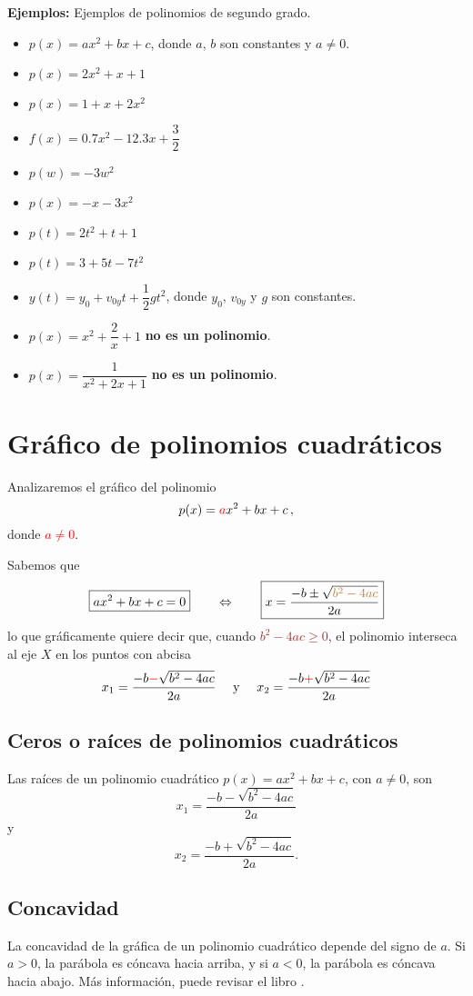 \documentclass{article}
\begin{document}
\medskip

\noindent
\textbf{Ejemplos:}
Ejemplos de polinomios de segundo grado.
\begin{itemize}
\item $p(x)=ax^2+bx+c$, donde $a$, $b$ son constantes y $a\neq 0$.
\item $p(x)=2x^2+x+1$
\item $p(x)=1+x+2x^2$
\item $f(x)=0.7x^2-12.3x+\dfrac{3}{2}$
\item $p(w)=-3w^2$
\item $p(x)=-x-3x^2$
\item $p(t)=2t^2+t+1$
\item $p(t)=3+5t-7t^2$
\item $y(t)=y_0+v_{0y}t+\dfrac{1}{2}gt^2$, donde $y_0$, $v_{0y}$ y $g$
  son constantes.
\item $p(x)=x^2+\dfrac{2}{x}+1$ \textbf{no es un polinomio}.
\item $p(x)=\dfrac{1}{x^2+2x+1}$ \textbf{no es un polinomio}.
\end{itemize}



\section{Gr\'afico de polinomios cuadr\'aticos}

Analizaremos el gr\'afico del polinomio
\[
  p(x)=\textcolor{red}{a}x^2+bx+c\,,
\]
donde \textcolor{red}{$a\neq 0$}.

Sabemos que
\[
  \boxed{ax^2+bx+c=0}
  \qquad\Leftrightarrow\qquad
  \boxed{x=\dfrac{-b\pm\sqrt{\textcolor{brown}{b^2-4ac}}}{2a}}
\]
lo que gr\'aficamente quiere decir que, cuando
\textcolor{brown}{$b^2-4ac\geq 0$},
el polinomio interseca al eje $X$ en los puntos con abcisa
\[
  x_1=\dfrac{-b\textcolor{red}{-}\sqrt{b^2-4ac}}{2a}
  \quad\text{ y }\quad
  x_2=\dfrac{-b\textcolor{red}{+}\sqrt{b^2-4ac}}{2a}
\]





    

\subsection{Ceros o ra\'ices de polinomios cuadr\'aticos}
Las ra\'ices de un polinomio cuadr\'atico $p(x) = ax^2 + bx + c$, con
$a\neq 0$, son
\[x_1 = \frac{-b - \sqrt{b^2 - 4ac}}{2a}\]
y
\[x_2 = \frac{-b + \sqrt{b^2 - 4ac}}{2a}.\]

\subsection{Concavidad}
La concavidad de la gr\'afica de un polinomio cuadr\'atico depende del signo
de $a$. Si $a > 0$, la par\'abola es c\'oncava hacia arriba, y si $a < 0$,
la par\'abola es c\'oncava hacia abajo.
M\'as informaci\'on, puede revisar el libro \cite{Z08}.




\end{document}
